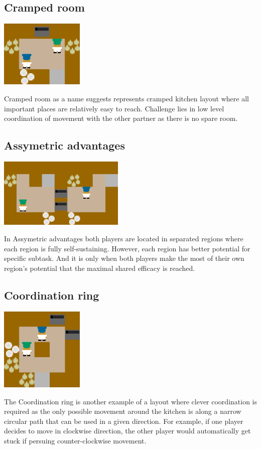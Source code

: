\par 
\subsection*{Cramped room}
\begin{center}
    \includegraphics*[width=4cm]{../img/cramped_room_layout.png}
\end{center}
Cramped room as a name suggests represents cramped kitchen layout where all important places are relatively easy to reach. Challenge lies in low level coordination of movement with the other partner as there is no spare room.

    

\subsection*{Assymetric advantages}
\begin{center}
    \includegraphics*[width=6cm]{../img/asymmetric_advantages_layout.png}
\end{center}
In Assymetric advantages both players are located in separated regions where each region is fully self-sustaining. However, each region has better potential for specific subtask. 
And it is only when both players make the most of their own region's potential that the maximal shared efficacy is reached.

\subsection*{Coordination ring}
\begin{center}
    \includegraphics*[width=4cm]{../img/coordination_ring_layout.png}
\end{center}
The Coordination ring is another example of a layout where clever coordination is required as the only possible movement around the kitchen is along a narrow circular path that can be used in a given direction.
For example, if one player decides to move in clockwise direction, the other player would automatically get stuck if persuing counter-clockwise movement.

